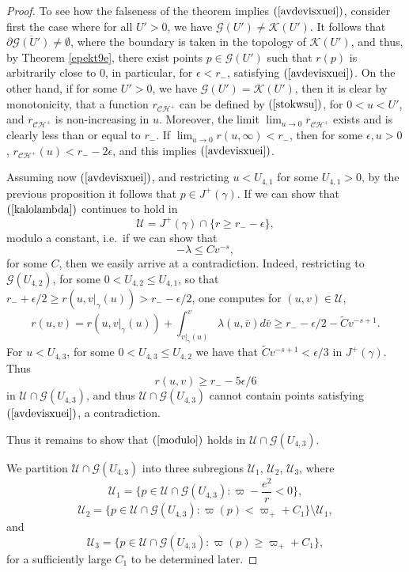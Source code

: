 \documentclass{article}
\begin{document}
{\begin{proof}
To see how the falseness of the theorem implies
$(\ref{avdevisxuei})$, consider first the case where
for all $U'>0$, we have $\mathcal{G}(U')\ne\mathcal{K}(U')$.
It follows that $\partial\overline{\mathcal{G}(U')}\ne\emptyset$,
where the boundary is taken in the topology of $\mathcal{K}(U')$,
and thus, by Theorem \ref{epekt9e}, there exist points $p\in\mathcal{G}(U')$ 
such that $r(p)$ is arbitrarily close to $0$,
in particular, for $\epsilon<r_-$, satisfying $(\ref{avdevisxuei})$.
On the other hand, if for some $U'>0$, we have
$\mathcal{G}(U')=\mathcal{K}(U')$, then it is clear by monotonicity,
that a function $r_{\mathcal{CH}^+}$ can be defined by $(\ref{stokwsu})$,
for $0<u<U'$, and $r_{\mathcal{CH}^+}$ is non-increasing
in $u$. Moreover,
the limit $\lim_{u\to0}{r_{\mathcal{CH}^+}}$ exists
and is clearly less than or equal to $r_-$. If
$\lim_{u\to0}{r(u,\infty)}<r_-$, then for some $\epsilon,u>0$, 
$r_{\mathcal{CH}^+}(u)<r_--2\epsilon$, and this 
implies $(\ref{avdevisxuei})$. 

Assuming now $(\ref{avdevisxuei})$,
and restricting $u<U_{4,1}$ for some $U_{4,1}>0$, by the previous
proposition it follows that
$p\in J^+(\gamma)$. If we can show that
$(\ref{kalolambda})$ continues to hold in 
\[
\mathcal{U}=J^+(\gamma)\cap\{r\ge r_--\epsilon\},
\]
modulo a constant, i.e.~if we can show that
\begin{equation}
\label{modulo}
-\lambda\le Cv^{-s},
\end{equation}
for some $C$,
then we easily arrive at a contradiction.
Indeed, restricting to $\mathcal{G}(U_{4,2})$, for some
$0<U_{4,2}\le U_{4,1}$, so that 
$r_-+\epsilon/2\ge r(u,v|_\gamma(u))>r_--\epsilon/2$,
one computes for $(u,v)\in\mathcal{U}$,
\[
r(u,v)=r(u,v|_\gamma(u))+\int_{v|_\gamma(u)}^v{\lambda(u,\bar{v}) d\bar{v}}\ge
r_--\epsilon/2-\tilde{C}v^{-s+1}.
\]
For $u<U_{4,3}$, for some $0<U_{4,3}\le U_{4,2}$ 
we have that $\tilde{C}v^{-s+1}<\epsilon/3$ in $J^+(\gamma)$.
Thus 
\[
r(u,v)\ge r_--5\epsilon/6
\]
in $\mathcal{U}\cap\mathcal{G}(U_{4,3})$, 
and thus $\mathcal{U}\cap\mathcal{G}(U_{4,3})$ 
cannot contain points satisfying $(\ref{avdevisxuei})$,
a contradiction.

Thus it remains to show that
$(\ref{modulo})$ holds in $\mathcal{U}\cap\mathcal{G}(U_{4,3})$.

We partition $\mathcal{U}\cap\mathcal{G}(U_{4,3})$ into three subregions
$\mathcal{U}_1$, $\mathcal{U}_2$, $\mathcal{U}_3$, where
\[
\mathcal{U}_1=\{p\in\mathcal{U}\cap\mathcal{G}(U_{4,3}):\varpi-\frac{e^2}r<0\},
\]
\[
\mathcal{U}_2=\{p\in\mathcal{U}\cap\mathcal{G}
(U_{4,3}):\varpi(p)<\varpi_++C_1\}\setminus\mathcal{U}_1,
\]
and
\[
\mathcal{U}_3=\{p\in\mathcal{U}\cap\mathcal{G}(U_{4,3}):\varpi(p)\ge\varpi_++C_1\},
\]
for a sufficiently large $C_1$ to be determined later.


\end{proof}}
\end{document}
